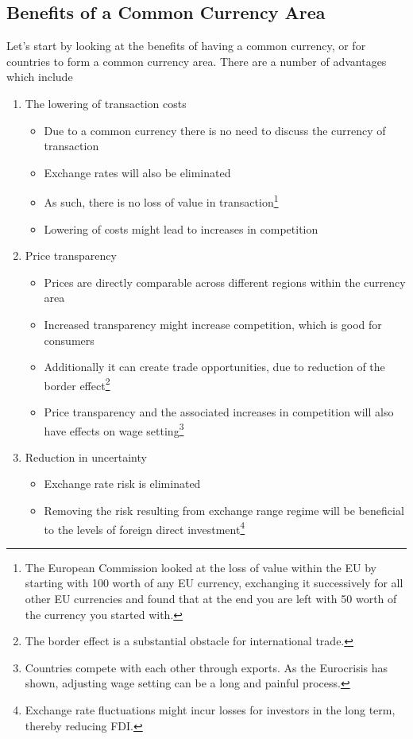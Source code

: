 \documentclass{tufte-handout}
\begin{document}
\subsection{Benefits of a Common Currency Area}
Let's start by looking at the benefits of having a common currency, or for countries to form a common currency area. 
There are a number of advantages which include
\begin{enumerate}
	\item The lowering of transaction costs
	\begin{itemize}
	  \item Due to a common currency there is no need to discuss the currency of transaction
	  \item Exchange rates will also be eliminated
	  \item As such, there is no loss of value in transaction\footnote{The European Commission looked at the loss of value within the EU by starting with 100 worth of any EU currency, exchanging it successively for all other EU currencies and found that at the end you are left with 50 worth of the currency you started with.}
	  \item Lowering of costs might lead to increases in competition
	\end{itemize}

	\item Price transparency
	\begin{itemize}
	  \item Prices are directly comparable across different regions within the currency area
	  \item Increased transparency might increase competition, which is good for consumers
	  \item	Additionally it can create trade opportunities, due to reduction of the border effect\footnote{The border effect is a substantial obstacle for international trade.}
	  \item Price transparency and the associated increases in competition will also have effects on wage setting\footnote{Countries compete with each other through exports. As the Eurocrisis has shown, adjusting wage setting can be a long and painful process.}
	\end{itemize}	

	\item Reduction in uncertainty
	\begin{itemize}
	  \item Exchange rate risk is eliminated
	  \item Removing the risk resulting from exchange range regime will be beneficial to the levels of foreign direct investment\footnote{Exchange rate fluctuations might incur losses for investors in the long term, thereby reducing FDI.}
	\end{itemize}


\end{enumerate}
\end{document}
